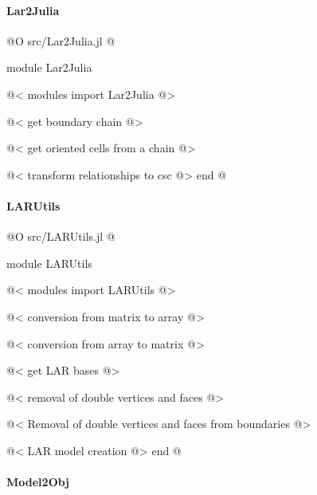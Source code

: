 \documentclass[11pt,oneside]{article}	%
\begin{document}
\paragraph{Lar2Julia}

@O src/Lar2Julia.jl
@{module Lar2Julia

@< modules import Lar2Julia @>

@< get boundary chain @>

@< get oriented cells from a chain @>

@< transform relationships to csc @>
end
@}

\paragraph{LARUtils}

@O src/LARUtils.jl
@{module LARUtils

@< modules import LARUtils @>

@< conversion from matrix to array @>

@< conversion from array to matrix @>

@< get LAR bases @>

@< removal of double vertices and faces @>

@< Removal of double vertices and faces from boundaries @>

@< LAR model creation @>
end
@}

\paragraph{Model2Obj}
\end{document}
